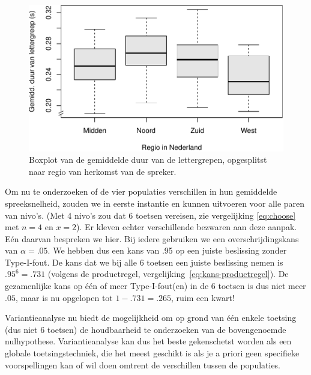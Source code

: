 \documentclass[
]{book}
\begin{document}
\begin{figure}
\centering
\includegraphics{KMS-NL_files/figure-latex/syldur-boxplot-1.pdf}
\caption{\label{fig:syldur-boxplot}Boxplot van de gemiddelde duur van de lettergrepen, opgesplitst naar regio van herkomst van de spreker.}
\end{figure}

Om nu te onderzoeken of de vier populaties verschillen in hun gemiddelde
spreeksnelheid, zouden we in eerste instantie en kunnen uitvoeren voor
alle paren van nivo's. (Met 4 nivo's zou dat 6 toetsen vereisen, zie
vergelijking \eqref{eq:choose} met \(n=4\) en \(x=2\)). Er kleven echter
verschillende bezwaren aan deze aanpak. Eén daarvan bespreken we hier.
Bij iedere gebruiken we een overschrijdingskans van \(\alpha=.05\). We
hebben dus een kans van .95 op een juiste beslissing zonder Type-I-fout.
De kans dat we bij alle 6 toetsen een juiste beslissing nemen is
\(.95^6 = .731\) (volgens de productregel,
vergelijking~\eqref{eq:kans-productregel}). De gezamenlijke kans op één of meer
Type-I-fout(en) in de 6 toetsen is dus niet meer \(.05\), maar is nu
opgelopen tot \(1-.731 = .265\), ruim een kwart!

Variantieanalyse nu biedt de mogelijkheid om op grond van één enkele
toetsing (dus niet 6 toetsen) de houdbaarheid te onderzoeken van de
bovengenoemde nulhypothese. Variantieanalyse kan dus het beste
gekenschetst worden als een globale toetsingstechniek, die het meest
geschikt is als je a priori geen specifieke voorspellingen kan of wil
doen omtrent de verschillen tussen de populaties.
\end{document}
